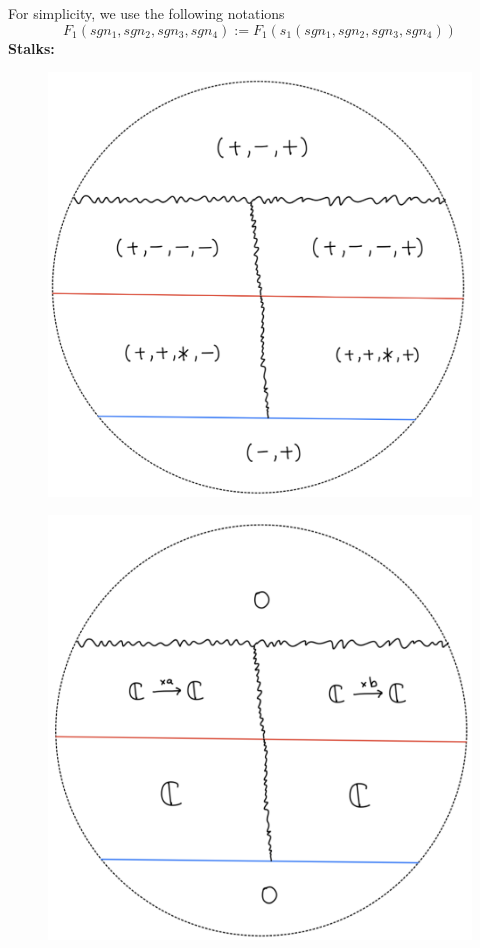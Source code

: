For simplicity, we use the following notations
\[
F_1(sgn_1,sgn_2,sgn_3,sgn_4):= F_1(s_1(sgn_1,sgn_2,sgn_3,sgn_4))
\]
\textbf{Stalks:}
\begin{figure}[H]
    \centering
    \includegraphics[scale = 0.45]{diagrams/lemma2/45.png} 
    \caption{}
    \label{fig:your-label}
\end{figure}
\begin{figure}[H]
    \centering
    \includegraphics[scale = 0.45]{diagrams/lemma2/46.png} 
    \caption{}
    \label{fig:your-label}
\end{figure}
